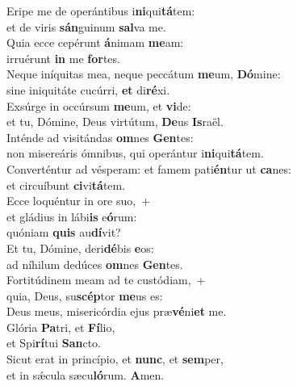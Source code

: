 \evenverse Eripe me de operántibus i\textbf{ni}qui\textbf{tá}tem:~\*\\
\evenverse et de viris \textbf{sán}guinum \textbf{sal}va me.\\
\oddverse Quia ecce cepérunt \textbf{á}nimam \textbf{me}am:~\*\\
\oddverse irruérunt \textbf{in} me \textbf{for}tes.\\
\evenverse Neque iníquitas mea, neque peccátum \textbf{me}um, \textbf{Dó}mine:~\*\\
\evenverse sine iniquitáte cucúrri, \textbf{et} di\textbf{ré}xi.\\
\oddverse Exsúrge in occúrsum \textbf{me}um, et \textbf{vi}de:~\*\\
\oddverse et tu, Dómine, Deus virtútum, \textbf{De}us \textbf{Is}raël.\\
\evenverse Inténde ad visitándas \textbf{om}nes \textbf{Gen}tes:~\*\\
\evenverse non misereáris ómnibus, qui operántur i\textbf{ni}qui\textbf{tá}tem.\\
\oddverse Converténtur ad vésperam: et famem pati\textbf{én}tur ut \textbf{ca}nes:~\*\\
\oddverse et circuíbunt \textbf{ci}vi\textbf{tá}tem.\\
\evenverse Ecce loquéntur in ore suo,~+\\
\evenverse  et gládius in lábi\textbf{is} e\textbf{ó}rum:~\*\\
\evenverse quóniam \textbf{quis} au\textbf{dí}vit?\\
\oddverse Et tu, Dómine, deri\textbf{dé}bis \textbf{e}os:~\*\\
\oddverse ad níhilum dedúces \textbf{om}nes \textbf{Gen}tes.\\
\evenverse Fortitúdinem meam ad te custódiam,~+\\
\evenverse  quia, Deus, su\textbf{scép}tor \textbf{me}us es:~\*\\
\evenverse Deus meus, misericórdia ejus præ\textbf{vé}ni\textbf{et} me.\\
\oddverse Glória \textbf{Pa}tri, et \textbf{Fí}lio,~\*\\
\oddverse et Spi\textbf{rí}tui \textbf{San}cto.\\
\evenverse Sicut erat in princípio, et \textbf{nunc}, et \textbf{sem}per,~\*\\
\evenverse et in sǽcula sæcu\textbf{ló}rum. \textbf{A}men.\\
